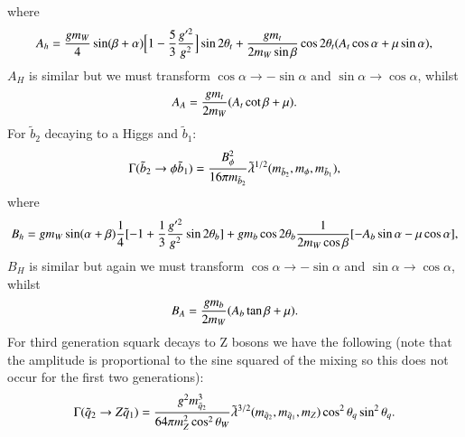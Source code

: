 \documentclass[final,3p,times]{elsarticle}
\begin{document}
where
\begin{equation}
\begin{aligned}
A_h = {g m_W \over 4} \sin(\beta+\alpha)\Big[1- {5 \over 3}{g'^2 \over g^2}\Big]\sin2\theta_t + {g m_t \over 2m_{W}\sin\beta}\cos2\theta_t (A_t \cos\alpha + \mu \sin\alpha),
\end{aligned}
\end{equation}
$A_H$ is similar but we must transform $\cos\alpha \rightarrow -\sin\alpha$ and $\sin\alpha \rightarrow \cos\alpha$, whilst
\begin{equation}
\begin{aligned}
A_A = {g m_t \over 2 m_W} (A_t \cot\beta + \mu).
\end{aligned}
\end{equation}
For $\tilde{b}_2$ decaying to a Higgs and $\tilde{b}_1$:
\begin{equation}\label{b2b1phi}
\begin{aligned}
\Gamma (\tilde{b}_2 \rightarrow \phi \tilde{b}_1) = {B_{\phi}^2 \over 16\pi m_{\tilde{b}_2} } \tilde{\lambda}^{1/2} (m_{\tilde{b}_2}, m_\phi, m_{\tilde{b}_1}),
\end{aligned}
\end{equation} 
where
\begin{equation}
\begin{aligned}
B_h = g m_W \sin(\alpha + \beta) {1 \over 4} [-1 + {1 \over 3}{g'^2 \over g^2} \sin2 \theta_b] + g m_b \cos2 \theta_b {1 \over 2 m_W \cos{\beta}} [ -A_b \sin\alpha - \mu \cos\alpha],
\end{aligned}
\end{equation}
$B_H$ is similar but again we must transform $\cos\alpha \rightarrow -\sin\alpha$ and $\sin\alpha \rightarrow \cos\alpha$, whilst
\begin{equation}
\begin{aligned}
B_A = {g m_b \over 2 m_W} (A_b \tan\beta +\mu).
\end{aligned}
\end{equation}
For third generation squark decays to Z bosons we have the following (note
that the amplitude is proportional to the sine squared of the mixing so this
does not occur for the first two generations): 
\begin{equation}\label{q2q1Z}
\begin{aligned}
\Gamma (\tilde{q}_2 \rightarrow Z \tilde{q}_1) = {g^2 m_{\tilde{q}_2}^3 \over 64\pi m_{Z}^2 \cos^2 \theta_W} \tilde{\lambda}^{3/2}(m_{\tilde{q}_2}, m_{\tilde{q}_1}, m_Z) \cos^2 \theta_q \sin^2 \theta_q.
\end{aligned}
\end{equation} 
\end{document}
